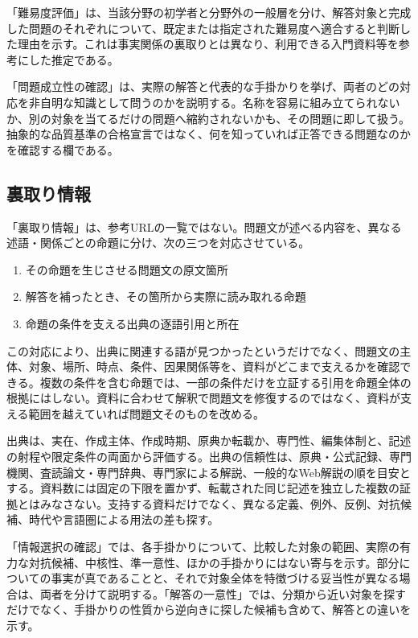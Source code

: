 「難易度評価」は、当該分野の初学者と分野外の一般層を分け、解答対象と完成した問題のそれぞれについて、既定または指定された難易度へ適合すると判断した理由を示す。これは事実関係の裏取りとは異なり、利用できる入門資料等を参考にした推定である。

「問題成立性の確認」は、実際の解答と代表的な手掛かりを挙げ、両者のどの対応を非自明な知識として問うのかを説明する。名称を容易に組み立てられないか、別の対象を当てるだけの問題へ縮約されないかも、その問題に即して扱う。抽象的な品質基準の合格宣言ではなく、何を知っていれば正答できる問題なのかを確認する欄である。

\subsection*{裏取り情報}

「裏取り情報」は、参考URLの一覧ではない。問題文が述べる内容を、異なる述語・関係ごとの命題に分け、次の三つを対応させている。

\begin{enumerate}
  \item その命題を生じさせる問題文の原文箇所
  \item 解答を補ったとき、その箇所から実際に読み取れる命題
  \item 命題の条件を支える出典の逐語引用と所在
\end{enumerate}

この対応により、出典に関連する語が見つかったというだけでなく、問題文の主体、対象、場所、時点、条件、因果関係等を、資料がどこまで支えるかを確認できる。複数の条件を含む命題では、一部の条件だけを立証する引用を命題全体の根拠にはしない。資料に合わせて解釈で問題文を修復するのではなく、資料が支える範囲を越えていれば問題文そのものを改める。

出典は、実在、作成主体、作成時期、原典か転載か、専門性、編集体制と、記述の射程や限定条件の両面から評価する。出典の信頼性は、原典・公式記録、専門機関、査読論文・専門辞典、専門家による解説、一般的なWeb解説の順を目安とする。資料数には固定の下限を置かず、転載された同じ記述を独立した複数の証拠とはみなさない。支持する資料だけでなく、異なる定義、例外、反例、対抗候補、時代や言語圏による用法の差も探す。

「情報選択の確認」では、各手掛かりについて、比較した対象の範囲、実際の有力な対抗候補、中核性、準一意性、ほかの手掛かりにはない寄与を示す。部分についての事実が真であることと、それで対象全体を特徴づける妥当性が異なる場合は、両者を分けて説明する。「解答の一意性」では、分類から近い対象を探すだけでなく、手掛かりの性質から逆向きに探した候補も含めて、解答との違いを示す。

